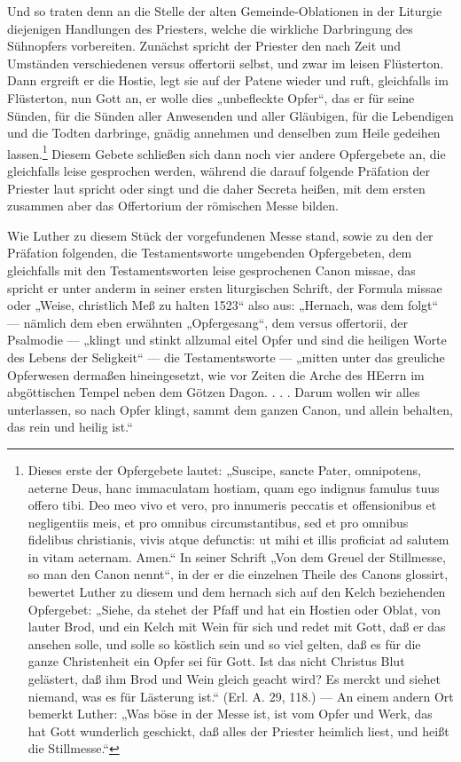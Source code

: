 Und so traten denn an die Stelle der alten Gemeinde-Oblationen in der Liturgie diejenigen Handlungen des Priesters, welche die wirkliche Darbringung des Sühnopfers vorbereiten. Zunächst spricht der Priester den nach Zeit und Umständen verschiedenen versus offertorii selbst, und zwar im leisen Flüsterton. Dann ergreift er die Hostie, legt sie auf der Patene wieder und ruft, gleichfalls im Flüsterton, nun Gott an, er wolle dies „unbefleckte Opfer“, das er für seine Sünden, für die Sünden aller Anwesenden und aller Gläubigen, für die Lebendigen und die Todten darbringe, gnädig annehmen und denselben zum Heile gedeihen lassen.\footnote{Dieses erste der Opfergebete lautet: „Suscipe, sancte Pater, omnipotens, aeterne Deus, hanc immaculatam hostiam, quam ego indignus famulus tuus offero tibi. Deo meo vivo et vero, pro innumeris peccatis et offensionibus et negligentiis meis, et pro omnibus circumstantibus, sed et pro omnibus fidelibus christianis, vivis atque defunctis: ut mihi et illis proficiat ad salutem in vitam aeternam. Amen.“ In seiner Schrift „Von dem Greuel der Stillmesse, so man den Canon nennt“, in der er die einzelnen Theile des Canons glossirt, bewertet Luther zu diesem und dem hernach sich auf den Kelch beziehenden Opfergebet: „Siehe, da stehet der Pfaff und hat ein Hostien oder Oblat, von lauter Brod, und ein Kelch mit Wein für sich und redet mit Gott, daß er das ansehen solle, und solle so köstlich sein und so viel gelten, daß es für die ganze Christenheit ein Opfer sei für Gott. Ist das nicht Christus Blut gelästert, daß ihm Brod und Wein gleich geacht wird? Es merckt und siehet niemand, was es für Lästerung ist.“ (Erl. A. 29, 118.) — An einem andern Ort bemerkt Luther: „Was böse in der Messe ist, ist vom Opfer und Werk, das hat Gott wunderlich geschickt, daß alles der Priester heimlich liest, und heißt die Stillmesse.“} Diesem Gebete schließen sich dann noch vier andere Opfergebete
an, die gleichfalls leise gesprochen werden, während die darauf folgende Präfation der Priester laut spricht oder singt und die daher Secreta heißen, mit dem ersten zusammen aber das Offertorium der römischen Messe bilden.

Wie Luther zu diesem Stück der vorgefundenen Messe stand, sowie zu den der Präfation folgenden, die Testamentsworte umgebenden Opfergebeten, dem gleichfalls mit den Testamentsworten leise gesprochenen Canon missae, das spricht er unter anderm in seiner ersten liturgischen Schrift, der Formula missae oder „Weise, christlich Meß zu halten 1523“ also aus: „Hernach, was dem folgt“ — nämlich dem eben erwähnten „Opfergesang“, dem versus offertorii, der Psalmodie — „klingt und stinkt allzumal eitel Opfer und sind die heiligen Worte des Lebens der Seligkeit“ — die Testamentsworte — „mitten unter das greuliche Opferwesen dermaßen hineingesetzt, wie vor Zeiten die Arche des HEerrn im abgöttischen Tempel neben dem Götzen Dagon. . . . Darum wollen wir alles unterlassen, so nach Opfer klingt, sammt dem ganzen Canon, und allein behalten, das rein und heilig ist.“

